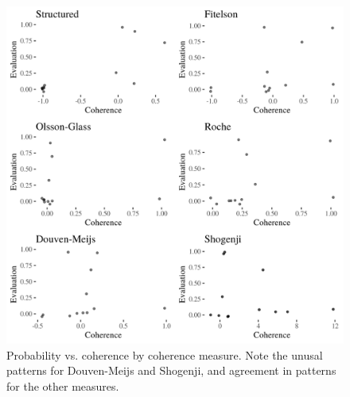 \documentclass[10pt,]{scrartcl}
\begin{document}
\begin{figure}[H]\centering
    \includegraphics{../images/cohPlots.png}
    \caption{Probability vs. coherence by coherence measure. Note the unusal patterns for Douven-Meijs and Shogenji, and agreement in patterns for the other measures.}
    \label{fig:cohplot}
\end{figure}
\end{document}
